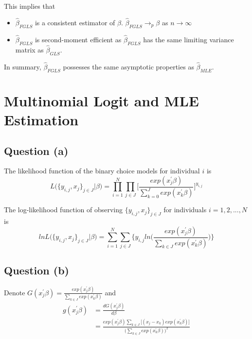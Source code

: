 \documentclass{article}
\begin{document}
This implies that 
\begin{itemize}
	\item $\hat \beta_{FGLS}$ is a consistent estimator of $\beta$. $\hat \beta_{FGLS} \rightarrow_p \beta$ as $n \rightarrow \infty$
	\item $\hat \beta_{FGLS}$ is second-moment efficient as $\hat \beta_{FGLS}$ has the same limiting variance matrix as $\hat \beta_{GLS}$. 
\end{itemize}

In summary, $\hat \beta_{FGLS}$ possesses the same asymptotic properties as $\hat \beta_{MLE}$. 

\section{Multinomial Logit and MLE Estimation}
\subsection*{Question (a)}
The likelihood function of the binary choice models for individual $i$ is 
\begin{equation*}
L\bigg(\{ y_{i,j}, x_j \}_{j \in J} \bigg| \beta \bigg) = \prod_{i = 1}^{N} \prod_{j \in J} \bigg[ \frac{exp(x_j^\prime \beta)}{ \sum_{k = 0}^{J} exp(x_k^\prime \beta)} \bigg]^{y_{i,j}} 
\end{equation*}


The log-likelihood function of observing $\{ y_{i,j}, x_j \}_{j \in J}$ for individuals $i = 1, 2, ..., N$ is 
\begin{equation*}
lnL\bigg(\{ y_{i,j}, x_j \}_{j \in J} \bigg| \beta \bigg) = \sum_{i = 1}^{N} \sum_{j \in J} \bigg\{  y_{i,j} ln \big( \frac{exp(x_j^\prime \beta)}{ \sum_{k \in J} exp(x_k^\prime \beta)} \big) \bigg\}
\end{equation*}

\subsection*{Question (b)}
Denote $G(x_j^\prime \beta) = \frac{exp(x_j^\prime \beta)}{ \sum_{k \in J} exp(x_k^\prime \beta)}$ and 
\begin{equation*}
\begin{split}
g(x_j^\prime \beta) & = \frac{ d G(x_j^\prime \beta) }{d \beta } \\
& = \frac{ exp(x_j^\prime \beta) \sum_{k \in J} \bigg[ (x_j - x_k) exp(x_k^\prime \beta) \bigg]  }{ \bigg(\sum_{k \in J} exp(x_k^\prime \beta) \bigg)^2  } \\
\end{split}
\end{equation*}
\end{document}
